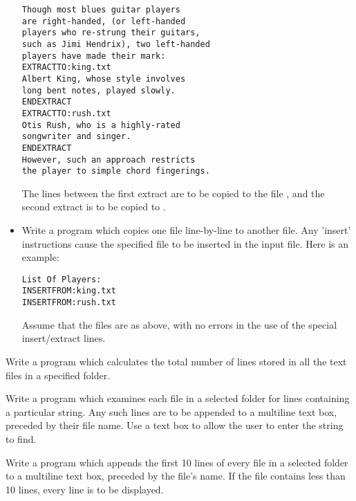 \begin{EXE}
\begin{itemize}
						\begin{verbatim}
Though most blues guitar players
are right-handed, (or left-handed
players who re-strung their guitars,
such as Jimi Hendrix), two left-handed
players have made their mark:
EXTRACTTO:king.txt
Albert King, whose style involves
long bent notes, played slowly.
ENDEXTRACT
EXTRACTTO:rush.txt
Otis Rush, who is a highly-rated
songwriter and singer.
ENDEXTRACT
However, such an approach restricts
the player to simple chord fingerings.
						\end{verbatim}
						The lines between the first extract are to be copied to the file , and the second extract is to be copied to .
    		  \item Write a program which copies one file line-by-line to another file. Any 'insert' instructions cause the specified file to be inserted in the input file. Here is an example:
						\begin{verbatim}
List Of Players:
INSERTFROM:king.txt
INSERTFROM:rush.txt
						\end{verbatim}
						Assume that the files are as above, with no errors in the use of the special insert/extract lines.
				\end{itemize}
			\item	Write a program which calculates the total number of lines stored in all the text files in a specified folder.
			\item	Write a program which examines each  file in a selected folder for lines containing a particular string. Any such lines are to be appended to a multiline text box, preceded by their file name. Use a text box to allow the user to enter the string to find.
			\item	Write a program which appends the first 10 lines of every  file in a selected folder to a multiline text box, preceded by the file's name. If the file contains less than 10 lines, every line is to be displayed.
		\end{EXE}

